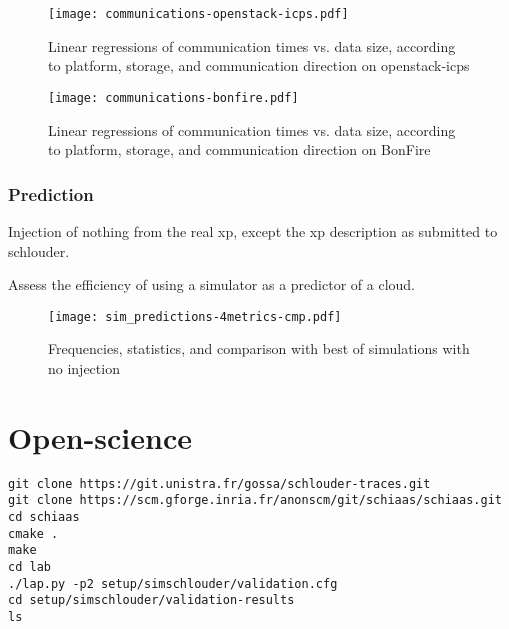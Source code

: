 \begin{figure}
  \centering
  \texttt{[image: communications-openstack-icps.pdf]}
  
  \caption{Linear regressions of communication times vs. data size, 
    according to platform, storage, and communication direction on openstack-icps}
\end{figure} 


\begin{figure}
  \centering
  \texttt{[image: communications-bonfire.pdf]}
  
  \caption{Linear regressions of communication times vs. data size, 
    according to platform, storage, and communication direction on BonFire}
\end{figure} 


\subsubsection{Prediction}

Injection of nothing from the real xp, except the xp description as submitted 
to schlouder.

Assess the efficiency of using a simulator as a predictor of a cloud.

\begin{figure}
  \centering
  \texttt{[image: sim\_predictions-4metrics-cmp.pdf]}
 
  
  
  

  
  \caption{Frequencies, statistics, and comparison with best of simulations with no injection}
\end{figure} 

\section{Open-science}

\begin{verbatim}
git clone https://git.unistra.fr/gossa/schlouder-traces.git
git clone https://scm.gforge.inria.fr/anonscm/git/schiaas/schiaas.git 
cd schiaas
cmake .
make
cd lab
./lap.py -p2 setup/simschlouder/validation.cfg
cd setup/simschlouder/validation-results
ls
\end{verbatim}





